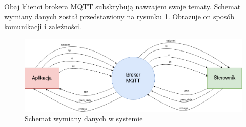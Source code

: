     Obaj klienci brokera MQTT subskrybują nawzajem swoje tematy. Schemat wymiany danych został przedstawiony na rysunku \ref{data_transmision}. Obrazuje on sposób komunikacji i zależności.
    
    \begin{figure}[ht]
      \centering
      \includegraphics[width=1\textwidth]{img/dane.png}
      \caption{Schemat wymiany danych w systemie}
      \label{data_transmision}
    \end{figure}
